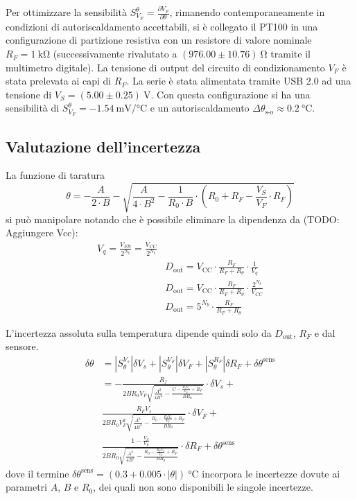 \documentclass{article}
\begin{document}
Per ottimizzare la sensibilità $S_{V_F}^{\theta}=\frac{\partial{V_F}}{\partial{\theta}}$, rimanendo contemporaneamente in condizioni di autoriscaldamento accettabili, si è collegato il PT100 in una configurazione di partizione resistiva con un resistore di valore nominale $R_F=\SI{1}{\kilo\ohm}$ (successivamente rivalutato a $(976.00\pm10.76)\SI{}{\ohm}$ tramite il multimetro digitale). La tensione di output del circuito di condizionamento $V_F$ è stata prelevata ai capi di $R_F$.
La serie è stata alimentata tramite USB 2.0 ad una tensione di $V_S=(5.00\pm0.25)\SI{}{\volt}$.
Con questa configurazione si ha una sensibilità di $S_{V_F}^{\theta}=\SI{-1.54}{\milli\volt\per\celsius}$ e un autoriscaldamento $\Delta\theta_{\text{s-o}}\approx\SI{0.2}{\celsius}$.
\subsection{Valutazione dell'incertezza}
La funzione di taratura
\begin{equation*}
    \theta=-\frac{A}{2\cdot B} - \sqrt{\frac{A}{4\cdot B^2} - \frac{1}{R_0\cdot B}\cdot\left(R_0+R_F-\frac{V_S}{V_F}\cdot R_F\right)}
\end{equation*}
si può manipolare notando che è possibile eliminare la dipendenza da (TODO: Aggiungere Vcc):
\begin{equation*}
    \begin{split}
        V_q = \frac{V_{FR}}{2^{N_b}}=\frac{V_{CC}}{2^{N_b}}\\
        &D_{\text{out}} = V_{\text{CC}} \cdot \frac{R_F}{R_F + R_{\theta}}\cdot\frac{1}{V_{q}}\\
        &D_{\text{out}} = V_{\text{CC}} \cdot \frac{R_F}{R_F + R_{\theta}}\cdot\frac{2^{N_b}}{V_{CC}}\\
        &D_{\text{out}} = 5^{N_b} \cdot \frac{R_F}{R_F + R_{\theta}}
    \end{split}
\end{equation*}

L'incertezza assoluta sulla temperatura dipende quindi solo da $D_{\text{out}}$, $R_F$ e dal sensore.
\begin{equation*}
    \begin{split}
        \delta\theta&=\left|S_{\theta}^{V_s}\right|\delta V_s+\left|S_{\theta}^{V_F}\right|\delta V_F+\left|S_{\theta}^{R_F}\right|\delta R_F+\delta \theta^{\text{sens}}\\
        &=-\frac{R_f}{2B R_0 V_F \sqrt{\frac{A^2}{4B^2} - \frac{C-\frac{R_f V_s}{V_F}+R_F}{B R_0}}}\cdot\delta V_s +\\
        &\frac{R_F V_s}{2BR_0 V_F^2\sqrt{\frac{A^2}{4B^2}-\frac{R_0 - \frac{R_F V_s}{V_F} + R_F}{B R_0}}}\cdot\delta V_F +\\
        &\frac{1-\frac{V_S}{V_F}}{2B R_0 \sqrt{\frac{A^2}{4B^2} - \frac{R_0-\frac{R_F V_S}{V_F} +R_F}{B R_0}}}\cdot\delta R_F+\delta \theta^{\text{sens}}
    \end{split}
\end{equation*}
dove il termine $\delta\theta^\text{sens}=(0.3+0.005\cdot|\theta|)\SI{}{\celsius}$ incorpora le incertezze dovute ai parametri $A$, $B$ e $R_0$, dei quali non sono disponibili le singole incertezze.
\end{document}
